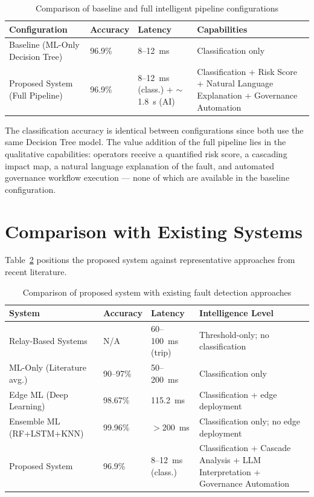 \begin{table}[H]
\centering
\fontsize{10}{12}\selectfont
\begin{tabular}{|p{5cm}|p{2.5cm}|p{2.5cm}|p{3cm}|}
\hline
\textbf{Configuration} & \textbf{Accuracy} & \textbf{Latency} & \textbf{Capabilities} \\
\hline
Baseline (ML-Only Decision Tree) & 96.9\% & 8--12~ms & Classification only \\
\hline
Proposed System (Full Pipeline) & 96.9\% & 8--12~ms (class.) + $\sim$1.8~s (AI) & Classification + Risk Score + Natural Language Explanation + Governance Automation \\
\hline
\end{tabular}
\caption{Comparison of baseline and full intelligent pipeline configurations}
\label{c5:tab3}
\end{table}

The classification accuracy is identical between configurations since both use the same Decision Tree model. The value addition of the full pipeline lies in the qualitative capabilities: operators receive a quantified risk score, a cascading impact map, a natural language explanation of the fault, and automated governance workflow execution — none of which are available in the baseline configuration.

\section{Comparison with Existing Systems}

Table~\ref{c5:tab4} positions the proposed system against representative approaches from recent literature.

\begin{table}[H]
\centering
\fontsize{10}{12}\selectfont
\begin{tabular}{|p{4.5cm}|p{2.2cm}|p{2.2cm}|p{3.5cm}|}
\hline
\textbf{System} & \textbf{Accuracy} & \textbf{Latency} & \textbf{Intelligence Level} \\
\hline
Relay-Based Systems & N/A & 60--100~ms (trip) & Threshold-only; no classification \\
\hline
ML-Only (Literature avg.) \cite{Zhang2025} & 90--97\% & 50--200~ms & Classification only \\
\hline
Edge ML (Deep Learning) \cite{EdgeML2024} & 98.67\% & 115.2~ms & Classification + edge deployment \\
\hline
Ensemble ML (RF+LSTM+KNN) \cite{Anwar2025} & 99.96\% & $>$200~ms & Classification only; no edge deployment \\
\hline
Proposed System & 96.9\% & 8--12~ms (class.) & Classification + Cascade Analysis + LLM Interpretation + Governance Automation \\
\hline
\end{tabular}
\caption{Comparison of proposed system with existing fault detection approaches}
\label{c5:tab4}
\end{table}

